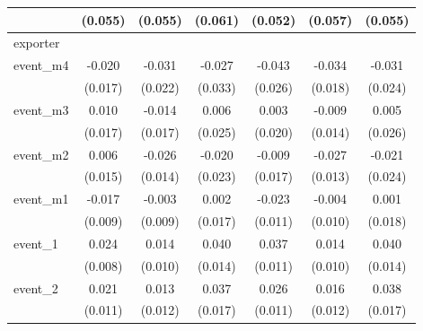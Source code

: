 {\begin{tabular}{l*{6}{c}}
            &     (0.055)         &     (0.055)         &     (0.061)         &     (0.052)         &     (0.057)         &     (0.055)         \\
\hline
exporter    &                     &                     &                     &                     &                     &                     \\
event\_m4    &      -0.020         &      -0.031         &      -0.027         &      -0.043         &      -0.034         &      -0.031         \\
            &     (0.017)         &     (0.022)         &     (0.033)         &     (0.026)         &     (0.018)         &     (0.024)         \\
[1em]
event\_m3    &       0.010         &      -0.014         &       0.006         &       0.003         &      -0.009         &       0.005         \\
            &     (0.017)         &     (0.017)         &     (0.025)         &     (0.020)         &     (0.014)         &     (0.026)         \\
[1em]
event\_m2    &       0.006         &      -0.026         &      -0.020         &      -0.009         &      -0.027\sym{*}  &      -0.021         \\
            &     (0.015)         &     (0.014)         &     (0.023)         &     (0.017)         &     (0.013)         &     (0.024)         \\
[1em]
event\_m1    &      -0.017         &      -0.003         &       0.002         &      -0.023\sym{*}  &      -0.004         &       0.001         \\
            &     (0.009)         &     (0.009)         &     (0.017)         &     (0.011)         &     (0.010)         &     (0.018)         \\
[1em]
event\_1     &       0.024\sym{**} &       0.014         &       0.040\sym{**} &       0.037\sym{***}&       0.014         &       0.040\sym{**} \\
            &     (0.008)         &     (0.010)         &     (0.014)         &     (0.011)         &     (0.010)         &     (0.014)         \\
[1em]
event\_2     &       0.021         &       0.013         &       0.037\sym{*}  &       0.026\sym{*}  &       0.016         &       0.038\sym{*}  \\
            &     (0.011)         &     (0.012)         &     (0.017)         &     (0.011)         &     (0.012)         &     (0.017)         \\

\end{tabular}}
